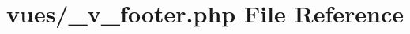 \hypertarget{__v__footer_8php}{}\section{vues/\+\_\+v\+\_\+footer.php File Reference}
\label{__v__footer_8php}

